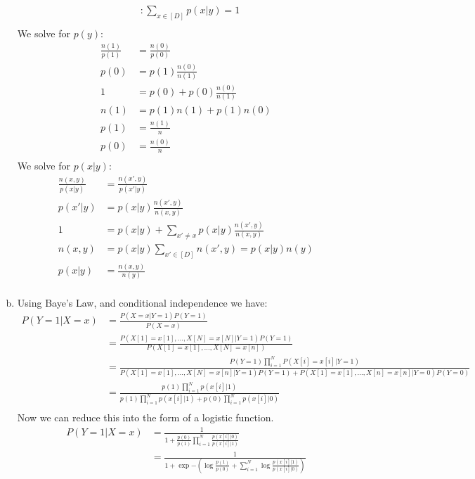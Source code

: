 \documentclass{amsart}
\theoremstyle{definition}
\begin{document}
\begin{enumerate}[(a)]
\begin{align*}
			[\lambda_y] &: \sum_{x \in [D]} p(x|y) = 1\\
		\end{align*}
		We solve for $p(y)$:
		\begin{align*}
			\frac{n(1)}{p(1)} &= \frac{n(0)}{p(0)}\\
			p(0)&= p(1)\frac{n(0)}{n(1)}\\
			1 &= p(0) + p(0) \frac{n(0)}{n(1)}\\
			n(1) &= p(1)n(1) + p(1)n(0)\\
			p(1) &= \frac{n(1)}{n}\\
			p(0) &= \frac{n(0)}{n}\\
		\end{align*}
		We solve for $p(x|y)$:
		\begin{align*}
			\frac{n(x, y)}{p(x|y)} &= \frac{n(x', y)}{p(x'|y)}\\
			p(x'|y) &= p(x|y)\frac{n(x', y)}{n(x, y)}\\
			1 &= p(x|y) + \sum_{x' \neq x} p(x|y) \frac{n(x', y)}{n(x,y)}\\
			n(x,y) &= p(x|y)\sum_{x' \in [D]} n(x', y) = p(x|y) n(y)\\
			p(x|y) &= \frac{n(x,y)}{n(y)}\\
		\end{align*}
	\item 
		Using Baye's Law, and conditional independence we have:
		\begin{align*}
			P(Y = 1|X = x) &= \frac{P(X = x| Y= 1)P(Y=1)}{P(X = x)}\\
			&= \frac{P(X[1] = x[1], \ldots, X[N] = x[N]| Y = 1) P(Y = 1)}{P(X[1] = x[1], \ldots, X[N] = x[n])}\\
			&= \frac{P(Y=1)\prod_{i=1}^{N} P(X[i] = x[i]|Y=1)}{P(X[1] = x[1], \ldots, X[N] = x[n]|Y = 1)P(Y = 1) + P(X[1] = x[1], \ldots, X[n] = x[n]| Y = 0) P(Y=0)}\\
			&= \frac{p(1) \prod_{i=1}^{N}p(x[i]|1)}{p(1)\prod_{i=1}^{N}p(x[i]|1) + p(0)\prod_{i=1}^{N}p(x[i]|0)}\\
		\end{align*}
		Now we can reduce this into the form of a logistic function.
		\begin{align*}
			P(Y = 1| X = x) &= \frac{1}{1 + \frac{p(0)}{p(1)}\prod_{i = 1}^{N} \frac{p(x[i]|0)}{p(x[i]|1)}}\\
			&= \frac{1}{1 + \exp{-\left(\log\frac{p(1)}{p(0)} + \sum_{i=1}^{N}\log\frac{p(x[i]|1)}{p(x[i]|0)}\right)}}\\
		\end{align*}

\end{enumerate}
\end{document}
